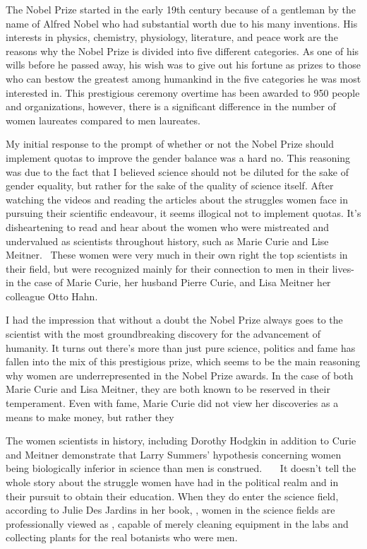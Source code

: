 
\par
The Nobel Prize started in the early 19th century because of a gentleman by the name of Alfred Nobel who had 
substantial worth due to his many inventions. His interests in physics, chemistry, physiology, literature, 
and peace work are the reasons why the Nobel Prize is divided into five different categories. As one of his 
wills before he passed away, his wish was to give out his fortune as prizes to those who can bestow the 
greatest among humankind in the five categories he was most interested in. This prestigious ceremony overtime 
has been awarded to 950 people and organizations, however, there is a significant difference in the number of 
women laureates compared to men laureates.

\par
My initial response to the prompt of whether or not the Nobel Prize should implement quotas to improve the 
gender balance was a hard no. This reasoning was due to the fact that I believed science should not be 
diluted for the sake of gender equality, but rather for the sake of the quality of science itself. After 
watching the videos and reading the articles about the struggles women face in pursuing their scientific 
endeavour, it seems illogical not to implement quotas. It’s disheartening to read and hear about the women 
who were mistreated and undervalued as scientists throughout history, such as Marie Curie and Lise Meitner.\cite{kopievanpbs}~\cite{jardins}
These women were very much in their own right the top scientists in their field, but were recognized mainly for 
their connection to men in their lives-in the case of Marie Curie, her husband Pierre Curie, and Lisa Meitner 
her colleague Otto Hahn.

\par
I had the impression that without a doubt the Nobel Prize always goes to the scientist with the most groundbreaking 
discovery for the advancement of humanity. It turns out there’s more than just pure science, politics and fame has 
fallen into the mix of this prestigious prize, which seems to be the main reasoning why women are underrepresented 
in the Nobel Prize awards. In the case of both Marie Curie and Lisa Meitner, they are both known to be reserved in 
their temperament. Even with fame, Marie Curie did not view her discoveries as a means to make money, but rather 
they \cite{jardins}

\par
The women scientists in history, including Dorothy Hodgkin in addition to Curie and Meitner demonstrate that Larry 
Summers’ hypothesis concerning women being biologically inferior in science than men is construed.~\cite{dorothy1}~\cite{dorothy2}~\cite{jardins}
It doesn’t tell the whole story about the struggle women have had in the political realm and in their pursuit to obtain 
their education. When they do enter the science field, according to Julie Des Jardins in her book, , women in the science fields are professionally viewed as ,\cite{jardins} capable of merely cleaning equipment in the labs and collecting 
plants for the real botanists who were men. 

